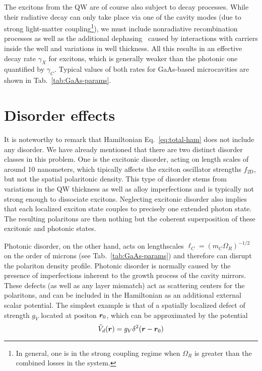 The excitons from the QW are of course also subject to decay
processes. While their radiative decay can only take place via one of
the cavity modes (due to strong light-matter coupling\footnote{In
  general, one is in the strong coupling regime when $\Omega_R$ is
  greater than the combined losses in the system.}), we must include
nonradiative recombination processes as well as the additional
dephasing~\cite{Liew2011} caused by interactions with carriers inside
the well and variations in well thickness. All this results in an
effective decay rate $\gamma_X$ for excitons, which is generally
weaker than the photonic one quantified by $\gamma_C$. Typical values
of both rates for GaAs-based microcavities are shown in
Tab.~\ref{tab:GaAs-params}.


\section{Disorder effects}
\label{sec:disorder}


It is noteworthy to remark that Hamiltonian Eq.~\eqref{eq:total-ham}
does not include any disorder. We have already mentioned that there
are two distinct disorder classes in this problem. One is the
excitonic disorder, acting on length scales of around 10 nanometers,
which tipically affects the exciton oscillator strengths
$f_{\text{2D}}$, but not the spatial polaritonic density. This type of
disorder stems from variations in the QW thickness as well as alloy
imperfections and is typically not strong enough to dissociate
excitons. Neglecting excitonic disorder also implies that each
localized exciton state couples to precisely one extended photon
state. The resulting polaritons are then nothing but the coherent
superposition of these excitonic and photonic states.

Photonic disorder, on the other hand, acts on lengthscales
$\ell_{C} = (m_{C}\Omega_R)^{-1/2}$ on the order of microns (see
Tab.~\ref{tab:GaAs-params}) and therefore can disrupt the polariton
density profile. Photonic disorder is normally caused by the presence
of imperfections inherent to the growth process of the cavity
mirrors. These defects (as well as any layer mismatch) act as
scattering centers for the polaritons, and can be included in the
Hamiltonian as an additional external scalar potential. The simplest
example is that of a spatially localized defect of strength $g_V$
located at positon $\bm{r}_0$, which can be approximated by the potential
%
\begin{equation}\label{eq:defect-pot}
  \tilde{V}_d(\bm{r}) = g_V \delta^2(\bm{r} - \bm{r}_0)
\end{equation}
% 

